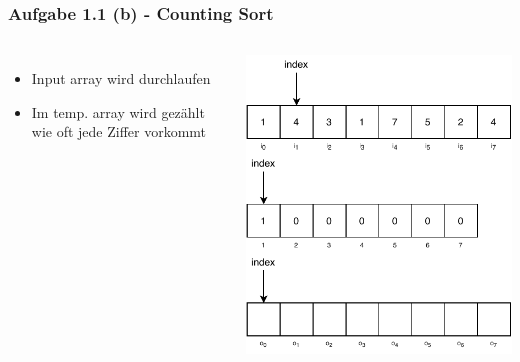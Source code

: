 \documentclass[aspectratio=169]{beamer}
\begin{document}
\begin{frame}
	\frametitle{Aufgabe 1.1 (b) - Counting Sort}
	\begin{columns}[c] %
	
	\begin{itemize}
		\item Input array wird durchlaufen
		\item Im temp. array wird gezählt wie oft jede Ziffer vorkommt
	\end{itemize}
	
	\includegraphics[scale=.7]{cs1.pdf}
	
	\end{columns}
	\end{frame}
\end{document}
